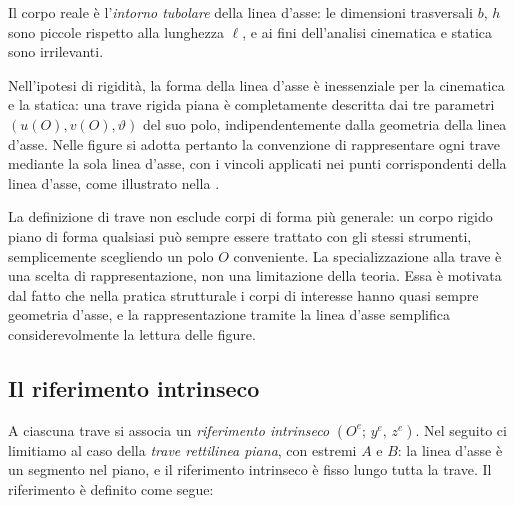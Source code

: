 Il corpo reale è l'\emph{intorno tubolare} della
linea d'asse: le dimensioni trasversali $b$, $h$
sono piccole rispetto alla lunghezza $\ell$, e ai
fini dell'analisi cinematica e statica sono
irrilevanti.

Nell'ipotesi di rigidità, la forma della linea d'asse è
inessenziale per la cinematica e la statica: una trave
rigida piana è completamente descritta dai tre parametri
$(u(O), v(O), \vartheta)$ del suo polo, indipendentemente
dalla geometria della linea d'asse. Nelle figure si adotta
pertanto la convenzione di rappresentare ogni trave
mediante la sola linea d'asse, con i vincoli applicati
nei punti corrispondenti della linea d'asse, come
illustrato nella .




\begin{oss}
	La definizione di trave non esclude corpi di forma
	più generale: un corpo rigido piano di forma
	qualsiasi può sempre essere trattato con gli stessi
	strumenti, semplicemente scegliendo un polo $O$
	conveniente. La specializzazione alla trave è una
	scelta di rappresentazione, non una limitazione
	della teoria. Essa è motivata dal fatto che nella
	pratica strutturale i corpi di interesse hanno quasi
	sempre geometria d'asse, e la rappresentazione
	tramite la linea d'asse semplifica considerevolmente
	la lettura delle figure.
\end{oss}







\subsection{Il riferimento intrinseco}
\label{sec:riferimento_intrinseco}

A ciascuna trave si associa un \emph{riferimento
	intrinseco} $(O^e;\, y^e,\, z^e)$. Nel seguito ci
limitiamo al caso della \emph{trave rettilinea piana},
con estremi $A$ e $B$: la linea d'asse è un segmento
nel piano, e il riferimento intrinseco è fisso lungo
tutta la trave. Il riferimento è definito come segue:

